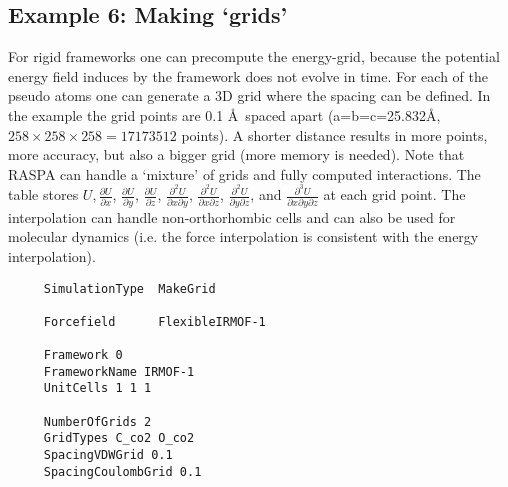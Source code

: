 \subsection*{Example 6: Making `grids'}

For rigid frameworks one can precompute the energy-grid, because the potential energy field induces by the framework does
not evolve in time. For each of the pseudo atoms one can generate a 3D grid where the spacing can be defined. In the example
the grid points are 0.1 \AA\ spaced apart (a=b=c=25.832\AA, $258\times258\times258=17173512$ points).
A shorter distance results in more points, more accuracy, but also a bigger
grid (more memory is needed). Note that RASPA can handle a `mixture' of grids and fully computed interactions.
The table stores $U,\frac{\partial U}{\partial x}$, $\frac{\partial U}{\partial y}$, $\frac{\partial U}{\partial z}$,
$\frac{\partial^2 U}{\partial x\partial y}$, $\frac{\partial^2 U}{\partial x\partial z}$, $\frac{\partial^2 U}{\partial y\partial z}$,
and $\frac{\partial^3 U}{\partial x\partial y \partial z}$ at each grid point. The interpolation can handle non-orthorhombic cells
and can also be used for molecular dynamics (i.e. the force interpolation is consistent with the energy interpolation).

\begin{tiny}
\begin{verbatim}
     SimulationType  MakeGrid

     Forcefield      FlexibleIRMOF-1

     Framework 0
     FrameworkName IRMOF-1
     UnitCells 1 1 1

     NumberOfGrids 2
     GridTypes C_co2 O_co2
     SpacingVDWGrid 0.1
     SpacingCoulombGrid 0.1
\end{verbatim}
\end{tiny}